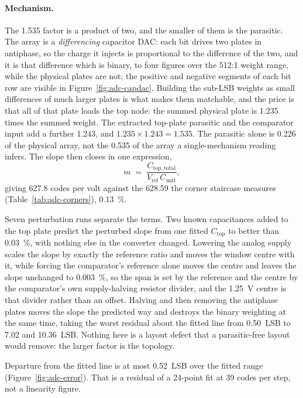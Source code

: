 \paragraph{Mechanism.} The 1.535 factor is a product of two, and the smaller of
them is the parasitic. The array is a \emph{differencing} capacitor DAC: each bit
drives two plates in antiphase, so the charge it injects is proportional to the
difference of the two, and it is that difference which is binary, to four
figures over the 512:1 weight range, while the physical plates are not; the
positive and negative segments of each bit row are visible in
Figure~\ref{fig:adc-capdac}. Building the sub-LSB weights as small differences of
much larger plates is what makes them matchable, and the price is that all of
that plate loads the top node:
the summed physical plate is 1.235 times the summed weight. The extracted
top-plate parasitic and the comparator input add a further 1.243, and
\(1.235\times 1.243 = 1.535\). The parasitic alone is \num{0.226} of the physical
array, not the \num{0.535} of the array a single-mechanism reading infers. The
slope then closes in one expression,
\[
  m \;=\; \frac{C_{\mathrm{top,total}}}{V_{\mathrm{ref}}\,C_{\mathrm{unit}}},
\]
giving \num{627.8} codes per volt against the \num{628.59} the corner staircase
measures (Table~\ref{tab:adc-corners}), \SI{0.13}{\percent}.

Seven perturbation runs separate the terms. Two known capacitances added to the
top plate predict the perturbed slope from one fitted \(C_{\mathrm{top}}\) to
better than \SI{0.03}{\percent}, with nothing else in the converter changed.
Lowering the analog supply scales the slope by exactly the reference ratio and
moves the window centre with it, while forcing the comparator's reference alone
moves the centre and leaves the slope unchanged to \SI{0.003}{\percent}, so
the span is set by the reference and the centre by the comparator's own
supply-halving resistor divider, and the \SI{1.25}{\volt} centre is that divider
rather than an offset. Halving and then removing the antiphase plates moves the
slope the predicted way and destroys the binary weighting at the same time,
taking the worst residual about the fitted line from \num{0.50}~LSB to
\num{7.02} and \num{10.36}~LSB. Nothing here is a layout defect that a
parasitic-free layout would remove: the larger factor is the topology.

Departure from the fitted line is at most \num{0.52}~LSB over the fitted range
(Figure~\ref{fig:adc-error}). That is a residual of a 24-point fit at
\num{39} codes per step, not a linearity figure.

